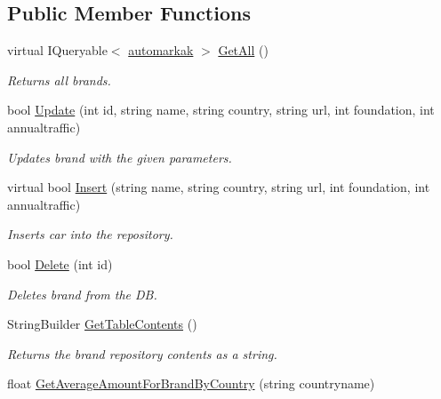 \subsection*{Public Member Functions}
\begin{DoxyCompactItemize}
\item 
virtual I\+Queryable$<$ \mbox{\hyperlink{class_car_shop_1_1_data_1_1automarkak}{automarkak}} $>$ \mbox{\hyperlink{class_car_shop_1_1_repository_1_1_brand_repository_a767cffc2be9413fdaefef87e37964cac}{Get\+All}} ()
\begin{DoxyCompactList}\small\item\em Returns all brands. \end{DoxyCompactList}\item 
bool \mbox{\hyperlink{class_car_shop_1_1_repository_1_1_brand_repository_ac56d251a67ea287168b831d7c14d3448}{Update}} (int id, string name, string country, string url, int foundation, int annualtraffic)
\begin{DoxyCompactList}\small\item\em Updates brand with the given parameters. \end{DoxyCompactList}\item 
virtual bool \mbox{\hyperlink{class_car_shop_1_1_repository_1_1_brand_repository_a100a758892ec499a3497cf1959b0c368}{Insert}} (string name, string country, string url, int foundation, int annualtraffic)
\begin{DoxyCompactList}\small\item\em Inserts car into the repository. \end{DoxyCompactList}\item 
bool \mbox{\hyperlink{class_car_shop_1_1_repository_1_1_brand_repository_a2dfc0f384a3914d6fcc3df0e2e842e4a}{Delete}} (int id)
\begin{DoxyCompactList}\small\item\em Deletes brand from the DB. \end{DoxyCompactList}\item 
String\+Builder \mbox{\hyperlink{class_car_shop_1_1_repository_1_1_brand_repository_a7b59be4a7c33c0e49ed4fa7a94c17e50}{Get\+Table\+Contents}} ()
\begin{DoxyCompactList}\small\item\em Returns the brand repository contents as a string. \end{DoxyCompactList}\item 
float \mbox{\hyperlink{class_car_shop_1_1_repository_1_1_brand_repository_ab882a12a4dd80da6ba290f43d3b69992}{Get\+Average\+Amount\+For\+Brand\+By\+Country}} (string countryname)

\end{DoxyCompactItemize}
